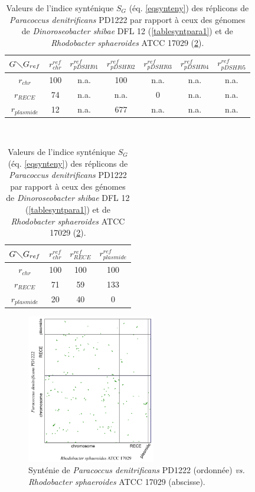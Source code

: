 \begin{table}[H]
\begin{center}
\caption[Valeurs de l'indice synténique pour \textit{Paracoccus}]{Valeurs de l'indice synténique $S_{G}$ (éq. \ref{eqsynteny}) des réplicons de \textit{Paracoccus denitrificans} PD1222 par rapport à ceux des génomes de \textit{Dinoroseobacter shibae} DFL 12 (\ref{tablesyntpara1}) et de \textit{Rhodobacter sphaeroides} ATCC 17029 (\ref{tablesyntpara2}).} 
	\label{tablesyntpara1}
	\begin{tabular}{c|cccccc}
		$G\diagdown G_{ref}$ & $r^{ref}_{chr}$ & $r^{ref}_{pDSHI01}$ & $r^{ref}_{pDSHI02}$ & $r^{ref}_{pDSHI03}$ & $r^{ref}_{pDSHI04}$ & $r^{ref}_{pDSHI05}$\\
		\hline
		$r_{chr}$ & 100 & n.a. & 100 & n.a. & n.a. & n.a.\\
		$r_{RECE}$ & 74 & n.a. & n.a. & 0 & n.a. & n.a.\\
		$r_{plasmide}$ & 12 & n.a. & 677 & n.a. & n.a. & n.a.\\ 
	\end{tabular}
\\ \vspace{1cm}
	 \label{tablesyntpara2}
	\begin{tabular}{c|ccc}
		$G \diagdown G_{ref}$ & $r^{ref}_{chr}$ & $r^{ref}_{RECE}$ & $r^{ref}_{plasmide}$\\
		\hline
		$r_{chr}$ & 100 & 100 & 100\\
		$r_{RECE}$ & 71 & 59 & 133\\
		$r_{plasmide}$ & 20 & 40 & 0\\ 
	\end{tabular}
\end{center}
\end{table} 
   

\begin{figure}[H]
		\begin{center}
			\includegraphics[width=0.5\textwidth]{./img/synteny/new/fig8_2.png}
		\caption[Synténie de \textit{Paracoccus} \textit{vs.}  \textit{R. sphaeroides}]{Synténie de \textit{Paracoccus denitrificans} PD1222 (ordonnée) \textit{vs.}  \textit{Rhodobacter sphaeroides} ATCC 17029 (abscisse).} \label{figsyntpara2}
		\end{center}
\end{figure}

